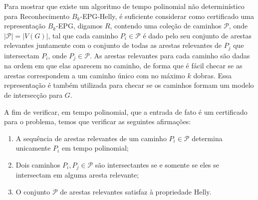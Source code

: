 


Para mostrar que existe um algoritmo de tempo polinomial não determinístico para {\sc Reconhecimento $B_k$-EPG-Helly}, é suficiente considerar como certificado uma representação $B_k$-EPG, digamos  $R$, contendo uma coleção de caminhos  $\mathcal{P}$, onde $|\mathcal{P}| = |V(G)|$, tal que cada caminho   $P_i \in \mathcal{P}$  é dado pelo seu conjunto de arestas relevantes juntamente com o conjunto de todas as arestas relevantes de $P_j$ que intersectam $P_i$, onde $P_j \in \mathcal{P}$.  %
 As arestas relevantes para cada caminho são dadas na ordem em que elas aparecem no caminho, de forma que é fácil checar se as arestas correspondem a um caminho único com no máximo  $k$ dobras. Essa representação é também utilizada para checar se os caminhos formam um modelo de intersecção para  $G$.

A fim de verificar, em tempo polinomial, que a entrada de fato é um certificado para o problema, temos que verificar as seguintes afirmações:

\begin{enumerate}[label=(\roman*)]
\item A sequência de arestas relevantes de um caminho $P_i\in \mathcal{P}$ determina unicamente $P_i$ em tempo polinomial; \label{it:bullet1}

\item Dois caminhos  $P_i, P_j \in \mathcal{P}$ são intersectantes se e somente se eles se intersectam em alguma aresta relevante; \label{it:bullet2}

\item O conjunto  $\mathcal{P}$ de arestas relevantes satisfaz à propriedade Helly. \label{it:bullet3}
\end{enumerate}

